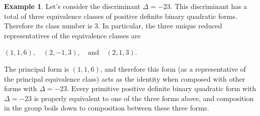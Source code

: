 \documentclass{article}
\theoremstyle{definition}
\theoremstyle{theorem}
\theoremstyle{example}
\newtheorem{example}{Example}[section]
\theoremstyle{corollary}
\begin{document}
\bigskip

\theoremstyle{example}
\begin{example}
Let's consider the discriminant \(\Delta = -23\). This discriminant has a total of three equivalence classes of positive definite binary quadratic forms. Therefore its class number is 3. In particular, the three unique reduced representatives of the equivalence classes are
\begin{center}
\((1, 1, 6), \quad (2, -1, 3), \quad \textrm{and} \quad (2, 1, 3)\).
\end{center}
The principal form is \((1, 1, 6)\), and therefore this form (as a representative of the principal equivalence class) acts as the identity when composed with other forms with \(\Delta = -23\). Every primitive positive definite binary quadratic form with \(\Delta = -23\) is properly equivalent to one of the three forms above, and composition in the group boils down to composition between these three forms. \square
\end{example}

\bigskip
\end{document}
